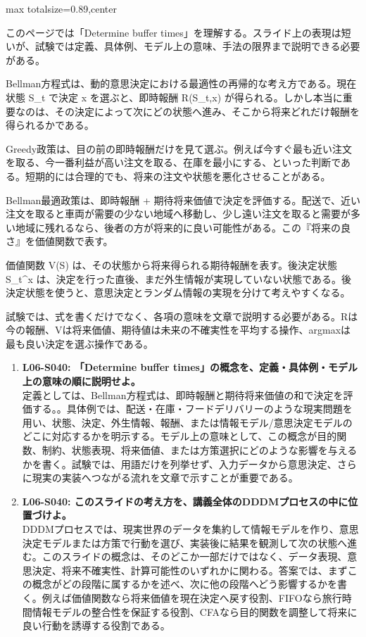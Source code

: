 \begin{minipage}[t]{0.58\textwidth}
\begin{adjustbox}{max totalsize={\textwidth}{0.89\textheight},center}
\begin{minipage}{\textwidth}\scriptsize
{}このページでは「Determine buffer times」を理解する。スライド上の表現は短いが、試験では定義、具体例、モデル上の意味、手法の限界まで説明できる必要がある。\par
Bellman方程式は、動的意思決定における最適性の再帰的な考え方である。現在状態 S\_t で決定 x を選ぶと、即時報酬 R(S\_t,x) が得られる。しかし本当に重要なのは、その決定によって次にどの状態へ進み、そこから将来どれだけ報酬を得られるかである。\par
Greedy政策は、目の前の即時報酬だけを見て選ぶ。例えば今すぐ最も近い注文を取る、今一番利益が高い注文を取る、在庫を最小にする、といった判断である。短期的には合理的でも、将来の注文や状態を悪化させることがある。\par
Bellman最適政策は、即時報酬 + 期待将来価値で決定を評価する。配送で、近い注文を取ると車両が需要の少ない地域へ移動し、少し遠い注文を取ると需要が多い地域に残れるなら、後者の方が将来的に良い可能性がある。この『将来の良さ』を価値関数で表す。\par
価値関数 V(S) は、その状態から将来得られる期待報酬を表す。後決定状態 S\_t\textasciicircum{}x は、決定を行った直後、まだ外生情報が実現していない状態である。後決定状態を使うと、意思決定とランダム情報の実現を分けて考えやすくなる。\par
試験では、式を書くだけでなく、各項の意味を文章で説明する必要がある。Rは今の報酬、Vは将来価値、期待値は未来の不確実性を平均する操作、argmaxは最も良い決定を選ぶ操作である。\par{}\begin{enumerate}\item \textbf{L06-S040: 「Determine buffer times」の概念を、定義・具体例・モデル上の意味の順に説明せよ。}\\定義としては、Bellman方程式は、即時報酬と期待将来価値の和で決定を評価する。。具体例では、配送・在庫・フードデリバリーのような現実問題を用い、状態、決定、外生情報、報酬、または情報モデル/意思決定モデルのどこに対応するかを明示する。モデル上の意味として、この概念が目的関数、制約、状態表現、将来価値、または方策選択にどのような影響を与えるかを書く。試験では、用語だけを列挙せず、入力データから意思決定、さらに現実の実装へつながる流れを文章で示すことが重要である。\item \textbf{L06-S040: このスライドの考え方を、講義全体のDDDMプロセスの中に位置づけよ。}\\DDDMプロセスでは、現実世界のデータを集約して情報モデルを作り、意思決定モデルまたは方策で行動を選び、実装後に結果を観測して次の状態へ進む。このスライドの概念は、そのどこか一部だけではなく、データ表現、意思決定、将来不確実性、計算可能性のいずれかに関わる。答案では、まずこの概念がどの段階に属するかを述べ、次に他の段階へどう影響するかを書く。例えば価値関数なら将来価値を現在決定へ戻す役割、FIFOなら旅行時間情報モデルの整合性を保証する役割、CFAなら目的関数を調整して将来に良い行動を誘導する役割である。\end{enumerate}

\end{minipage}
\end{adjustbox}
\end{minipage}
